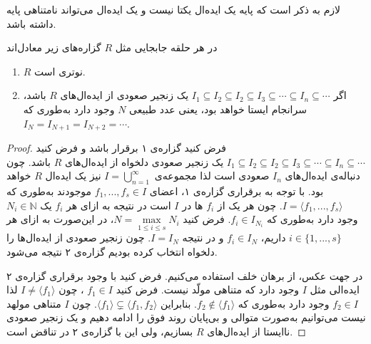 لازم به ذکر است که پایه‌  یک ایده‌ال یکتا نیست و یک ایده‌ال می‌تواند نامتناهی پایه‌ داشته باشد. 
\begin{theorem}
	\label{finitegen eq acc}
در هر حلقه‌  جابجایی مثل 
$R$
گزاره‌های زیر معادل‌اند
\begin{enumerate}
\item
$R$
نوتری است.
\item 
اگر 
$I_{1}\subseteq I_{2} \subseteq I_{2}\subseteq I_{3}\subseteq \cdots\subseteq I_{n}\subseteq\cdots$
یک زنجیر صعودی از ایده‌ال‌های 
$R$
باشد، سرانجام ایستا خواهد بود، یعنی عدد طبیعی 
$N$
وجود دارد به‌طوری که 
$I_{N} = I_{N+1} = I_{N+2} = \cdots$.
\end{enumerate}
\end{theorem}
\begin{proof}
فرض کنید گزاره‌ی ۱ برقرار باشد و فرض کنید 
$I_{1}\subseteq I_{2} \subseteq I_{2}\subseteq I_{3}\subseteq \cdots\subseteq I_{n}\subseteq\cdots$
یک زنجیر صعودی دلخواه از ایده‌ال‌های 
$R$
باشد. چون دنباله‌ی ایده‌ال‌های 
$I_{n}$
صعودی است لذا مجموعه‌ی 
$I = \bigcup_{n = 1}^{\infty}$
نیز یک ایده‌ال 
$R$
خواهد بود. با توجه به برقراری گزاره‌ی ۱، اعضای 
$f_{1},...,f_{s}\in I$
موجودند به‌طوری که 
$I = \langle f_{1},...,f_{s}\rangle$.
چون هر یک از 
$f_{i}$
ها در 
$I$
است در نتیجه به ازای هر 
$f_{i}$
یک 
$N_{i}\in \mathbb{N}$
وجود دارد به‌طوری که 
$f_{i}\in I_{N_{i}}$.
فرض کنید 
$N = \max\limits_{1\leq i\leq s}N_{i}$،
 در این‌صورت به ازای هر 
 $i\in\{1,...,s\}$
 داریم، 
 $f_{i}\in I_{N}$
 و در نتیجه 
 $I = I_{N}$.
 چون زنجیر صعودی از ایده‌ال‌ها را دلخواه انتخاب کرده بودیم گزاره‌ی ۲ نتیجه می‌شود.
 
 در جهت عکس، از برهان خلف استفاده می‌کنیم. فرض کنید با وجود برقراری گزاره‌ی ۲ ایده‌الی مثل 
 $I$
 وجود دارد که متناهی مولّد نیست. فرض کنید 
 $f_{1}\in I$
 ، چون
 $I\neq \langle f_{1}\rangle$
 لذا 
 $f_{2}\in I$
وجود دارد به‌طوری که 
$f_{2}\notin \langle f_{1}\rangle$.
بنابراین 
$\langle f_{1}\rangle \subsetneq \langle f_{1}, f_{2}\rangle$.
چون 
$I$
متناهی مولهد نیست می‌توانیم به‌صورت متوالی و بی‌پایان روند فوق را ادامه دهیم و یک زنجیر صعودی ناایستا از ایده‌ال‌های 
$R$
بسازیم، ولی این با گزاره‌ی ۲ در تناقض است.
\end{proof}

%

